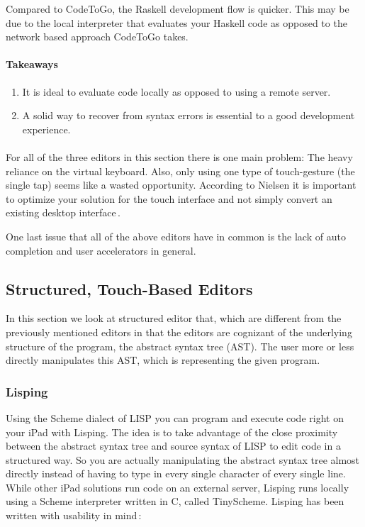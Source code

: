 Compared to CodeToGo, the Raskell development flow is quicker. This may be due to the local interpreter that evaluates your Haskell code as opposed to the network based approach CodeToGo takes. 

\paragraph{Takeaways}
\begin{enumerate}
	\item It is ideal to evaluate code locally as opposed to using a remote server.
	\item A solid way to recover from syntax errors is essential to a good development experience.
\end{enumerate}

\paragraph{}

For all of the three editors in this section there is one main problem: The heavy reliance on the virtual keyboard. Also, only using one type of touch-gesture (the single tap) seems like a wasted opportunity.
According to Nielsen it is important to optimize your solution for the touch
interface and not simply convert an existing desktop interface\,\cite[p 26, p
41]{nielsen2013mobile}.

One last issue that all of the above editors have in common is the lack of auto completion and user accelerators in general.

\subsection{Structured, Touch-Based Editors}
In this section we look at structured editor that, which are different from the previously mentioned editors in that the editors are cognizant of the underlying structure of the program, the abstract syntax tree (AST). The user more or less directly manipulates this AST, which is representing the given program.

\subsubsection{Lisping}
\label{subsub:Lisping}
Using the Scheme dialect of LISP you can program and execute code right on your iPad with Lisping. The idea is to take advantage of the close proximity between the abstract syntax tree and source syntax of LISP to edit code in a structured way. So you are actually manipulating the abstract syntax tree almost directly instead of having to type in every single character of every single line. While other iPad solutions run code on an external server, Lisping runs locally using a Scheme interpreter written in C, called TinyScheme. Lisping has been written with usability in mind\,\cite{lisping}: 


